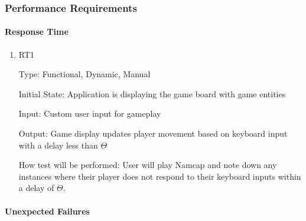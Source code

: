 \documentclass[12pt, titlepage]{article}
\begin{document}
\subsubsection{Performance Requirements}

\paragraph{Response Time}

\begin{enumerate}

\item{RT1\\}

Type: Functional, Dynamic, Manual
					
Initial State: Application is displaying the game board with game entities
					
Input: Custom user input for gameplay
					
Output: Game display updates player movement based on keyboard input with a delay less than $\hyperref[tab:constants]{\Theta}$
					
How test will be performed: User will play Namcap and note down any instances where their player does not respond to their keyboard inputs within a delay of $\hyperref[tab:constants]{\Theta}$.

\end{enumerate}

\paragraph{Unexpected Failures}
\end{document}
